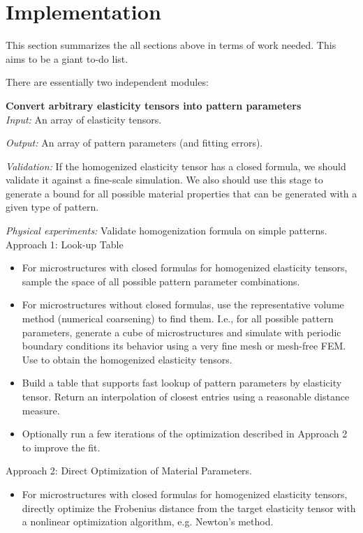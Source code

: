 \section{Implementation}
This section summarizes the all sections above in terms of work needed.  This
aims to be a giant to-do list.

There are essentially two independent modules:
\begin{description}
\item{\bf Convert arbitrary elasticity tensors into pattern parameters}\\
{\it Input:} An array of elasticity tensors.

{\it Output:} An array of pattern parameters (and fitting errors). 

{\it Validation:} If the homogenized elasticity tensor has a closed formula, we
should validate it against a fine-scale simulation. We also should use this
stage to generate a bound for all possible material properties that can be
generated with a given type of pattern.

{\it Physical experiments:}  Validate homogenization formula on simple patterns.\\

Approach 1: Look-up Table
\begin{itemize}
\item For microstructures with closed formulas for homogenized elasticity
    tensors, sample the space of all possible pattern parameter combinations.
\item For microstructures without closed formulas, use the representative volume
method (numerical coarsening) to find them.  I.e., for all possible pattern
parameters, generate a cube of microstructures and simulate with periodic
boundary conditions its behavior using a very fine mesh or mesh-free FEM.
Use \cite{Kharevych2009} to obtain the homogenized elasticity tensors.
\item Build a table that supports fast lookup of pattern parameters by
    elasticity tensor. Return an interpolation of closest entries using a
    reasonable distance measure.
\item Optionally run a few iterations of the optimization described in Approach
      2 to improve the fit.
\end{itemize}

Approach 2: Direct Optimization of Material Parameters.
\begin{itemize}
\item For microstructures with closed formulas for homogenized elasticity
    tensors, directly optimize the Frobenius distance from the target elasticity
    tensor with a nonlinear optimization algorithm, e.g. Newton's method.
\end{itemize}


\end{description}
